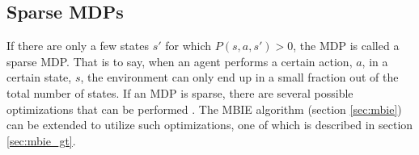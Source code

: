 \subsection{Sparse MDPs}

If there are only a few states $s'$ for which $P(s, a, s') > 0$, the MDP is called a sparse MDP. That is to say, when an agent performs a certain action, $a$, in a certain state, $s$, the environment can only end up in a small fraction out of the total number of states. If an MDP is sparse, there are several possible optimizations that can be performed \parencite{dietterich2013pac}. The MBIE algorithm (section \ref{sec:mbie}) can be extended to utilize such optimizations, one of which is described in section \ref{sec:mbie_gt}.